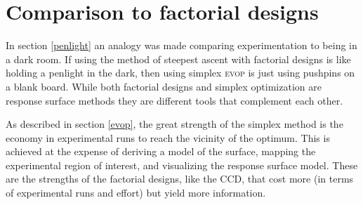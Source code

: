 \section{Comparison to factorial designs}
In section \ref{penlight} an analogy was made comparing experimentation to being in a dark room.  If using the method of steepest ascent with factorial designs is like holding a penlight in the dark, then using simplex \textsc{evop} is just using pushpins on a blank board.  While both factorial designs and simplex optimization are response surface methods they are different tools that complement each other.  

As described in section \ref{evop}, the great strength of the simplex method is the economy in experimental runs to reach the vicinity of the optimum.  This is achieved at the expense of deriving a model of the surface, mapping the experimental region of interest, and visualizing the response surface model.  These are the strengths of the factorial designs, like the CCD, that cost more (in terms of experimental runs and effort) but yield more information.
